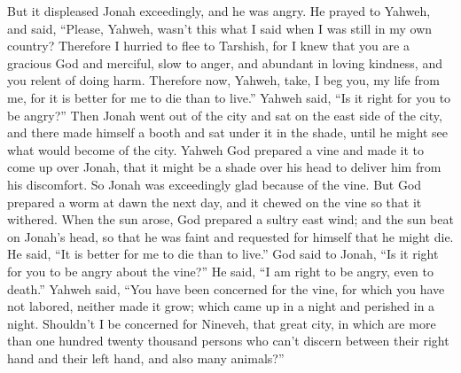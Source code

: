  But it displeased Jonah exceedingly, and he was angry.
 He prayed to Yahweh, and said, ``Please, Yahweh, wasn't
this what I said when I was still in my own country? Therefore I hurried
to flee to Tarshish, for I knew that you are a gracious God and
merciful, slow to anger, and abundant in loving kindness, and you relent
of doing harm.  Therefore now, Yahweh, take, I beg you, my
life from me, for it is better for me to die than to live.''
 Yahweh said, ``Is it right for you to be angry?''
 Then Jonah went out of the city and sat on the east side
of the city, and there made himself a booth and sat under it in the
shade, until he might see what would become of the city. 
Yahweh God prepared a vine and made it to come up over Jonah, that it
might be a shade over his head to deliver him from his discomfort. So
Jonah was exceedingly glad because of the vine.  But God
prepared a worm at dawn the next day, and it chewed on the vine so that
it withered.  When the sun arose, God prepared a sultry
east wind; and the sun beat on Jonah's head, so that he was faint and
requested for himself that he might die. He said, ``It is better for me
to die than to live.''  God said to Jonah, ``Is it right
for you to be angry about the vine?'' He said, ``I am right to be angry,
even to death.''  Yahweh said, ``You have been concerned
for the vine, for which you have not labored, neither made it grow;
which came up in a night and perished in a night. 
Shouldn't I be concerned for Nineveh, that great city, in which are more
than one hundred twenty thousand persons who can't discern between their
right hand and their left hand, and also many animals?''
